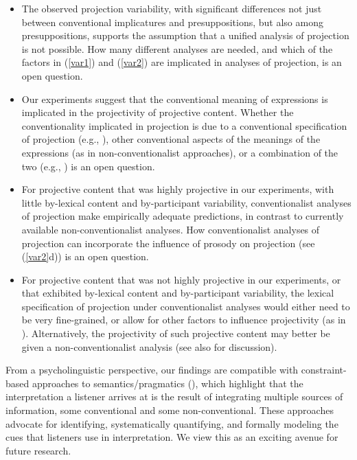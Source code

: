 \documentclass[11pt,fleqn]{article}
\newcommand{\6}{\mbox{$[\hspace*{-.6mm}[$}}
\newcommand{\9}{\mbox{$]\hspace*{-.6mm}]$}}
\begin{document}
\begin{itemize}[topsep=0pt,itemsep=-1pt]

\item The observed projection variability, with significant differences not just between conventional implicatures and presuppositions, but also among presuppositions, supports the assumption that a unified analysis of projection is not possible. How many different analyses are needed, and which of the factors in (\ref{var1}) and (\ref{var2}) are implicated in analyses of projection, is an open question. 

\item Our experiments suggest that the conventional meaning of expressions is implicated in the projectivity of projective content. Whether the conventionality implicated in projection is due to a conventional specification of projection (e.g., \citealt{heim83,vds92}), other conventional aspects of the meanings of the expressions (as in non-conventionalist approaches), or a combination of the two (e.g., \citealt{abrusan2011,abrusan2016}) is an open question.

\item For projective content that was highly projective in our experiments, with little by-lexical content and by-participant variability, conventionalist analyses of projection make empirically adequate predictions, in contrast to currently available non-conventionalist analyses. How conventionalist analyses of projection can incorporate the influence of prosody on projection (see (\ref{var2}d)) is an open question.

\item For projective content that was not highly projective in our experiments, or that exhibited by-lexical content and by-participant variability, the lexical specification of projection under conventionalist analyses would either need to be very fine-grained, or allow for other factors to influence projectivity (as in \citealt{abrusan2011,abrusan2016}). Alternatively, the projectivity of such projective content may better be given a non-conventionalist analysis (see also \citealt{kadmon01} for discussion).

\end{itemize}

From a psycholinguistic perspective, our findings are compatible with constraint-based approaches to semantics/pragmatics (\citealt{degentanenhaus2015}), which highlight that the interpretation a listener arrives at is the result of integrating multiple sources of information, some conventional and some non-conventional. These approaches advocate for identifying, systematically quantifying, and formally modeling the cues that listeners use in interpretation. We view this as an exciting avenue for future research.
\end{document}

